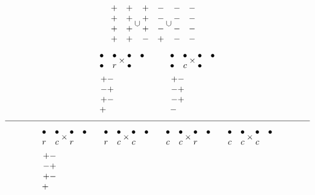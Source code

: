 \documentclass[11pt ,reqno]{amsart}
\begin{document}
\begin{example}
$$\begin{aligned}
    &\mat+\\+\\+\\+\emat
    &&\mat+\\+\\+\\+\emat\cup\mat +\\+\\+\\-\emat
    &&\mat-\\-\\-\\+\emat\cup\mat -\\-\\-\\-\emat
    &&\mat-\\-\\-\\-\emat
  \end{aligned}
  $$
$$
\begin{aligned}
&\mat\bullet&\bullet\\\bullet&r\emat\times\mat\bullet&\bullet\\\bullet&\emat\qquad
&&\mat\bullet&\bullet\\\bullet&c\emat\times\mat\bullet&\bullet\\\bullet &\emat
\\
&\mat+-\\-+\\+-\\+\quad\emat
&&\mat+-\\-+\\-+\\-\quad\emat
\end{aligned}
$$
$\line(1,0){360}$
$$
  \begin{aligned}
&  
\mat \bullet &\bullet\\r&c\emat \times\mat\bullet &\bullet\\{r}& \emat&&\quad\mat \bullet&
\bullet\\r&c\emat \times\mat\bullet& \bullet\\ {c}&\emat&&\quad\mat \bullet&
\bullet\\c&c\emat\times\mat\bullet& \bullet\\{r}& \emat&&\quad\mat \bullet&
\bullet\\c&c\emat \times\mat\bullet&\bullet\\{c}&\emat\\
&\mat +-\\-+\\+-\\{+}\quad\emat

\end{aligned}$$
\end{example}
\end{document}
